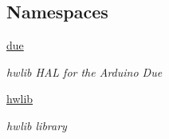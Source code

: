 \subsection*{Namespaces}
\begin{DoxyCompactItemize}
\item 
 \hyperlink{namespacedue}{due}
\begin{DoxyCompactList}\small\item\em hwlib H\+AL for the Arduino Due \end{DoxyCompactList}\item 
 \hyperlink{namespacehwlib}{hwlib}
\begin{DoxyCompactList}\small\item\em hwlib library \end{DoxyCompactList}\end{DoxyCompactItemize}
